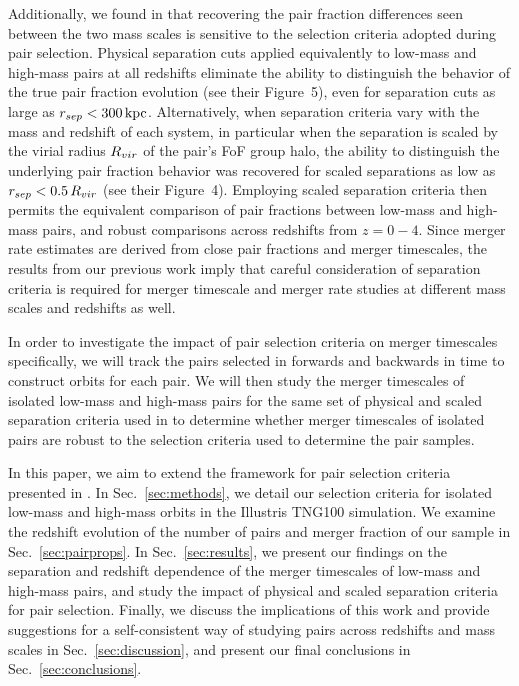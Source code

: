 \documentclass[twocolumn,linenumbers]{aastex631}
\newcommand{\chambe}{\citet{Chamberlain2024}}
\begin{document}
Additionally, we found in \citet{Chamberlain2024} that recovering the pair fraction differences seen between the two mass scales is sensitive to the selection criteria adopted during pair selection.
Physical separation cuts applied equivalently to low-mass and high-mass pairs at all redshifts eliminate the ability to distinguish the behavior of the true pair fraction evolution (see their Figure~5), even for separation cuts as large as $r_{sep}<300\mathrm{\,kpc}$. 
Alternatively, when separation criteria vary with the mass and redshift of each system, in particular when the separation is scaled by the virial radius $R_{vir}$ of the pair's FoF group halo, the ability to distinguish the underlying pair fraction behavior was recovered for scaled separations as low as $r_{sep} < 0.5\,R_{vir}$ (see their Figure~4). 
Employing scaled separation criteria then permits the equivalent comparison of pair fractions between low-mass and high-mass pairs, and robust comparisons across redshifts from $z=0-4$. 
Since merger rate estimates are derived from close pair fractions and merger timescales, the results from our previous work imply that careful consideration of separation criteria is required for merger timescale and merger rate studies at different mass scales and redshifts as well.

In order to investigate the impact of pair selection criteria on merger timescales specifically, we will track the pairs selected in \chambe{} forwards and backwards in time to construct orbits for each pair.
We will then study the merger timescales of isolated low-mass and high-mass pairs for the same set of physical and scaled separation criteria used in \chambe{} to determine whether merger timescales of isolated pairs are robust to the selection criteria used to determine the pair samples. 


In this paper, we aim to extend the framework for pair selection criteria presented in \chambe{}.
In Sec.~\ref{sec:methods}, we detail our selection criteria for isolated low-mass and high-mass orbits in the Illustris TNG100 simulation. 
We examine the redshift evolution of the number of pairs and merger fraction of our sample in Sec.~\ref{sec:pairprops}.
In Sec.~\ref{sec:results}, we present our findings on the separation and redshift dependence of the merger timescales of low-mass and high-mass pairs, and study the impact of physical and scaled separation criteria for pair selection. 
Finally, we discuss the implications of this work and provide suggestions for a self-consistent way of studying pairs across redshifts and mass scales in Sec.~\ref{sec:discussion}, and present our final conclusions in Sec.~\ref{sec:conclusions}.
\end{document}

